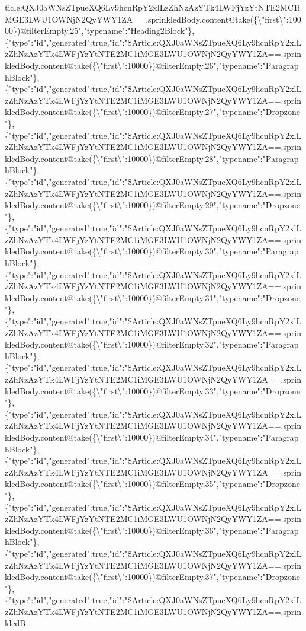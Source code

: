 ticle:QXJ0aWNsZTpueXQ6Ly9hcnRpY2xlLzZhNzAzYTk4LWFjYzYtNTE2MC1iMGE3LWU1OWNjN2QyYWY1ZA==.sprinkledBody.content@take(\{\textbackslash{}"first\textbackslash{}":10000\})@filterEmpty.25","typename":"Heading2Block"\},\{"type":"id","generated":true,"id":"\$Article:QXJ0aWNsZTpueXQ6Ly9hcnRpY2xlLzZhNzAzYTk4LWFjYzYtNTE2MC1iMGE3LWU1OWNjN2QyYWY1ZA==.sprinkledBody.content@take(\{\textbackslash{}"first\textbackslash{}":10000\})@filterEmpty.26","typename":"ParagraphBlock"\},\{"type":"id","generated":true,"id":"\$Article:QXJ0aWNsZTpueXQ6Ly9hcnRpY2xlLzZhNzAzYTk4LWFjYzYtNTE2MC1iMGE3LWU1OWNjN2QyYWY1ZA==.sprinkledBody.content@take(\{\textbackslash{}"first\textbackslash{}":10000\})@filterEmpty.27","typename":"Dropzone"\},\{"type":"id","generated":true,"id":"\$Article:QXJ0aWNsZTpueXQ6Ly9hcnRpY2xlLzZhNzAzYTk4LWFjYzYtNTE2MC1iMGE3LWU1OWNjN2QyYWY1ZA==.sprinkledBody.content@take(\{\textbackslash{}"first\textbackslash{}":10000\})@filterEmpty.28","typename":"ParagraphBlock"\},\{"type":"id","generated":true,"id":"\$Article:QXJ0aWNsZTpueXQ6Ly9hcnRpY2xlLzZhNzAzYTk4LWFjYzYtNTE2MC1iMGE3LWU1OWNjN2QyYWY1ZA==.sprinkledBody.content@take(\{\textbackslash{}"first\textbackslash{}":10000\})@filterEmpty.29","typename":"Dropzone"\},\{"type":"id","generated":true,"id":"\$Article:QXJ0aWNsZTpueXQ6Ly9hcnRpY2xlLzZhNzAzYTk4LWFjYzYtNTE2MC1iMGE3LWU1OWNjN2QyYWY1ZA==.sprinkledBody.content@take(\{\textbackslash{}"first\textbackslash{}":10000\})@filterEmpty.30","typename":"ParagraphBlock"\},\{"type":"id","generated":true,"id":"\$Article:QXJ0aWNsZTpueXQ6Ly9hcnRpY2xlLzZhNzAzYTk4LWFjYzYtNTE2MC1iMGE3LWU1OWNjN2QyYWY1ZA==.sprinkledBody.content@take(\{\textbackslash{}"first\textbackslash{}":10000\})@filterEmpty.31","typename":"Dropzone"\},\{"type":"id","generated":true,"id":"\$Article:QXJ0aWNsZTpueXQ6Ly9hcnRpY2xlLzZhNzAzYTk4LWFjYzYtNTE2MC1iMGE3LWU1OWNjN2QyYWY1ZA==.sprinkledBody.content@take(\{\textbackslash{}"first\textbackslash{}":10000\})@filterEmpty.32","typename":"ParagraphBlock"\},\{"type":"id","generated":true,"id":"\$Article:QXJ0aWNsZTpueXQ6Ly9hcnRpY2xlLzZhNzAzYTk4LWFjYzYtNTE2MC1iMGE3LWU1OWNjN2QyYWY1ZA==.sprinkledBody.content@take(\{\textbackslash{}"first\textbackslash{}":10000\})@filterEmpty.33","typename":"Dropzone"\},\{"type":"id","generated":true,"id":"\$Article:QXJ0aWNsZTpueXQ6Ly9hcnRpY2xlLzZhNzAzYTk4LWFjYzYtNTE2MC1iMGE3LWU1OWNjN2QyYWY1ZA==.sprinkledBody.content@take(\{\textbackslash{}"first\textbackslash{}":10000\})@filterEmpty.34","typename":"ParagraphBlock"\},\{"type":"id","generated":true,"id":"\$Article:QXJ0aWNsZTpueXQ6Ly9hcnRpY2xlLzZhNzAzYTk4LWFjYzYtNTE2MC1iMGE3LWU1OWNjN2QyYWY1ZA==.sprinkledBody.content@take(\{\textbackslash{}"first\textbackslash{}":10000\})@filterEmpty.35","typename":"Dropzone"\},\{"type":"id","generated":true,"id":"\$Article:QXJ0aWNsZTpueXQ6Ly9hcnRpY2xlLzZhNzAzYTk4LWFjYzYtNTE2MC1iMGE3LWU1OWNjN2QyYWY1ZA==.sprinkledBody.content@take(\{\textbackslash{}"first\textbackslash{}":10000\})@filterEmpty.36","typename":"ParagraphBlock"\},\{"type":"id","generated":true,"id":"\$Article:QXJ0aWNsZTpueXQ6Ly9hcnRpY2xlLzZhNzAzYTk4LWFjYzYtNTE2MC1iMGE3LWU1OWNjN2QyYWY1ZA==.sprinkledBody.content@take(\{\textbackslash{}"first\textbackslash{}":10000\})@filterEmpty.37","typename":"Dropzone"\},\{"type":"id","generated":true,"id":"\$Article:QXJ0aWNsZTpueXQ6Ly9hcnRpY2xlLzZhNzAzYTk4LWFjYzYtNTE2MC1iMGE3LWU1OWNjN2QyYWY1ZA==.sprinkledB